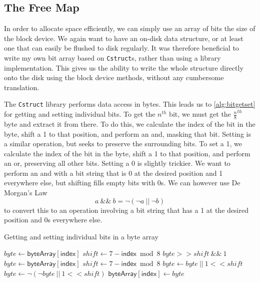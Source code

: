 \documentclass[12pt,a4paper,twoside,openright]{report}
\begin{document}
\subsection{The Free Map}
\label{subsec:freemap}

In order to allocate space efficiently, we can simply use an array of bits the size of the block device. We again want to have an on-disk data structure, or at least one that can easily be flushed to disk regularly. It was therefore beneficial to write my own bit array based on \texttt{Cstruct}s, rather than using a library implementation. This gives us the ability to write the whole structure directly onto the disk using the block device methods, without any cumbersome translation.

The \texttt{Cstruct} library performs data access in bytes. This leads us to \cref{alg:bitgetset} for getting and setting individual bits. To get the $n^{th}$ bit, we must get the $\frac{n}{8}^{th}$ byte and extract it from there. To do this, we calculate the index of the bit in the byte, shift a 1 to that position, and perform an and, masking that bit. Setting is a similar operation, but seeks to preserve the surrounding bits. To set a 1, we calculate the index of the bit in the byte, shift a 1 to that position, and perform an or, preserving all other bits. Setting a 0 is slightly trickier. We want to perform an and with a bit string that is 0 at the desired position and 1 everywhere else, but shifting fills empty bits with 0s. We can however use De Morgan's Law $$ a~\&\&~b = \neg (\neg a~||~\neg b) $$ to convert this to an operation involving a bit string that has a 1 at the desired position and 0s everywhere else.

\begin{algorithm}[H]
\caption{Getting and setting individual bits in a byte array}
\label{alg:bitgetset}
\begin{algorithmic}
\vskip 10pt
  \State $byte \gets \mathsf{byteArray[index]}$
  \State $shift \gets 7 - \mathsf{index} \bmod 8$
  \State \Return $byte >> shift~\&\&~1$
\EndFunction
\vskip 10pt
  \State $byte \gets \mathsf{byteArray[index]}$
  \State $shift \gets 7 - \mathsf{index} \bmod 8$
    \State $byte \gets byte~||~1 << shift$
  \Else
    \State $byte \gets \neg (\neg byte~||~1 << shift)$
  \EndIf
  \State $\mathsf{byteArray[index]} \gets byte$
\EndFunction
\vskip 10pt
\end{algorithmic}
\end{algorithm}
\end{document}

